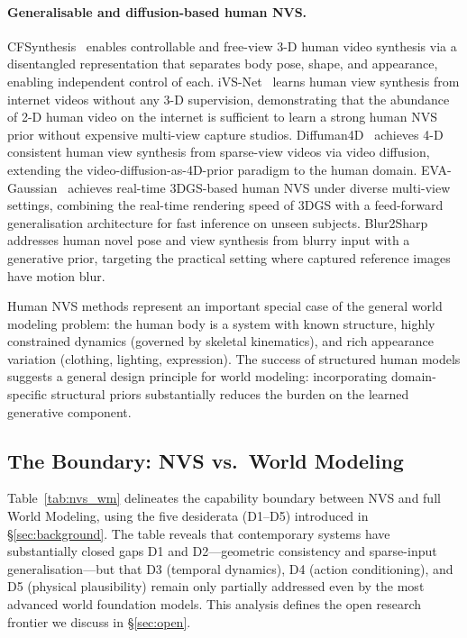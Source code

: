 \paragraph{Generalisable and diffusion-based human NVS.}
CFSynthesis~\citep{li2023cfsynth} enables controllable and free-view 3-D
human video synthesis via a disentangled representation that separates body
pose, shape, and appearance, enabling independent control of each.
iVS-Net~\citep{chen2024ivsnet} learns human view synthesis from internet
videos without any 3-D supervision, demonstrating that the abundance of
2-D human video on the internet is sufficient to learn a strong human NVS
prior without expensive multi-view capture studios.
Diffuman4D~\citep{zheng2024diffuman4d} achieves 4-D consistent human view
synthesis from sparse-view videos via video diffusion, extending the
video-diffusion-as-4D-prior paradigm to the human domain.
EVA-Gaussian~\citep{hu2024evacg} achieves real-time 3DGS-based human NVS
under diverse multi-view settings, combining the real-time rendering speed
of 3DGS with a feed-forward generalisation architecture for fast inference
on unseen subjects.
Blur2Sharp~\citep{dong2024blur2sharp} addresses human novel pose and view
synthesis from blurry input with a generative prior, targeting the practical
setting where captured reference images have motion blur.

Human NVS methods represent an important special case of the general world
modeling problem: the human body is a system with known structure, highly
constrained dynamics (governed by skeletal kinematics), and rich
appearance variation (clothing, lighting, expression).
The success of structured human models suggests a general design principle
for world modeling: incorporating domain-specific structural priors
substantially reduces the burden on the learned generative component.

\subsection{The Boundary: NVS vs.\ World Modeling}

Table~\ref{tab:nvs_wm} delineates the capability boundary between NVS and
full World Modeling, using the five desiderata (D1--D5) introduced in
\S\ref{sec:background}.
The table reveals that contemporary \nvs{} systems have substantially closed
gaps D1 and D2---geometric consistency and sparse-input generalisation---but
that D3 (temporal dynamics), D4 (action conditioning), and D5 (physical
plausibility) remain only partially addressed even by the most advanced
world foundation models.
This analysis defines the open research frontier we discuss in \S\ref{sec:open}.

